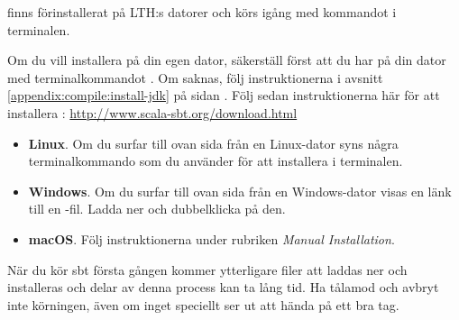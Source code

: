 \sbt finns förinstallerat på LTH:s datorer och körs igång med kommandot \sbt i terminalen.

Om du vill installera \sbt på din egen dator,
säkerställ först att du har  på din dator med terminalkommandot . Om  saknas, följ instruktionerna i avsnitt \ref{appendix:compile:install-jdk} på sidan \pageref{appendix:compile:install-jdk}. 
Följ sedan instruktionerna här för att installera \sbt: \url{http://www.scala-sbt.org/download.html} 

\begin{itemize}

\item \textbf{Linux}. Om du surfar till ovan sida från en Linux-dator syns några terminalkommando som du använder för att installera \sbt i terminalen. 

\item \textbf{Windows}. Om du surfar till ovan sida från en Windows-dator visas en länk till en -fil. Ladda ner och dubbelklicka på den.

\item \textbf{macOS}. Följ instruktionerna under rubriken \textit{Manual Installation}.

\end{itemize}

\noindent När du kör sbt första gången kommer ytterligare filer att laddas ner och installeras och delar av denna process kan ta lång tid. Ha tålamod och avbryt inte körningen, även om inget speciellt ser ut att hända på ett bra tag.

%
%


